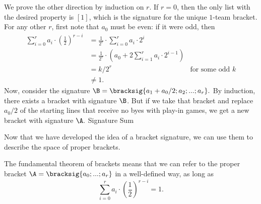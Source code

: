 {{        We prove the other direction by induction on $r$. If $r = 0$, then the only list with the desired property is $[1]$, which is the signature for the unique $1$-team bracket. For any other $r$, first note that $a_0$ must be even: if it were odd, then \begin{align*}
            \sum_{i=0}^r a_i \cdot \left(\frac{1}{2}\right)^{r - i}
            &= \frac{1}{2^r} \cdot \sum_{i=0}^r a_i \cdot 2^i\\
            &= \frac{1}{2^r} \cdot \left(a_0 + 2 \sum_{i=1}^r a_i \cdot 2^{i-1}\right)\\
            &= k/2^r &\textrm{for some odd $k$}\\
            &\neq 1.
        \end{align*}
        Now, consider the signature $\B = \bracksig{a_1 + a_0/2; a_2; ...; a_r}.$ By induction, there exists a bracket with signature $\B$. But if we take that bracket and replace $a_0/2$ of the starting lines that receive no byes with play-in games, we get a new bracket with signature $\A.$
}{Signature Sum}

Now that we have developed the idea of a bracket signature, we can use them to describe the space of proper brackets.


The fundamental theorem of brackets means that we can refer to the proper bracket $\A = \bracksig{a_0; ...; a_r}$ in a well-defined way, as long as $$\sum_{i=0}^r a_i \cdot \left(\frac{1}{2}\right)^{r - i} = 1.$$

}
